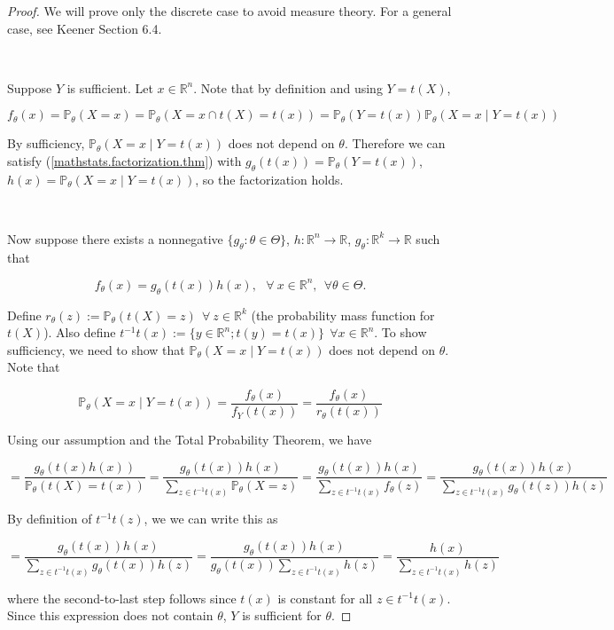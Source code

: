 \begin{proof} We will prove only the discrete case to avoid measure theory. For a general case, see Keener Section 6.4. 

\

Suppose \(Y\) is sufficient. Let \(x \in \mathbb{R}^n\). Note that by definition and using \(Y = t(X)\),

\[
f_\theta(x) = \mathbb{P}_\theta (X = x) = \mathbb{P}_\theta (X = x \cap t(X) = t(x)) = \mathbb{P}_\theta ( Y = t(x))   \mathbb{P}_\theta (X = x \mid Y = t(x)) 
\]

By sufficiency, \( \mathbb{P}_\theta (X = x \mid Y = t(x)) \) does not depend on \(\theta\). Therefore we can satisfy (\ref{mathstats.factorization.thm}) with \(g_\theta(t(x)) = \mathbb{P}_\theta ( Y = t(x))  \), \(h(x) = \mathbb{P}_\theta (X = x \mid Y = t(x))  \), so the factorization holds.

\

Now suppose there exists a nonnegative \(\{g_\theta: \theta \in \Theta\}\), \(h: \mathbb{R}^n \to \mathbb{R}\), \(g_\theta: \mathbb{R}^k \to \mathbb{R}\) such that

\[
f_\theta(x) = g_\theta(t(x)) h(x), \ \ \ \forall \ x \in \mathbb{R}^n, \ \ \forall \theta \in \Theta.
\]

Define \(r_\theta(z) := \mathbb{P}_\theta(t(X) = z)  \ \ \forall \ z \in \mathbb{R}^k\) (the probability mass function for \(t(X)\)).  Also define \(t^{-1} t(x) := \{y \in \mathbb{R}^n; t(y) = t(x) \} \ \ \forall x \in \mathbb{R}^n\). To show sufficiency, we need to show that \(\mathbb{P}_\theta (X = x \mid Y = t(x))\) does not depend on \(\theta\). Note that

\[
\mathbb{P}_\theta (X = x \mid Y = t(x)) = \frac{f_\theta(x)}{f_Y(t(x))}= \frac{f_\theta(x)}{r_\theta(t(x))}
\]

Using our assumption and the Total Probability Theorem, we have

\[
= \frac{ g_\theta(t(x) h(x))}{\mathbb{P}_\theta(t(X) = t(x))} = \frac{ g_\theta(t(x)) h(x)}{\sum_{z \in t^{-1} t(x)} \mathbb{P}_\theta (X = z)} = \frac{ g_\theta(t(x)) h(x)}{\sum_{z \in t^{-1} t(x)} f_\theta(z)}  = \frac{ g_\theta(t(x)) h(x)}{\sum_{z \in t^{-1} t(x)}  g_\theta(t(z)) h(z) }
\]

By definition of \(t^{-1}t(z)\), we we can write this as

\[
= \frac{ g_\theta(t(x)) h(x)}{\sum_{z \in t^{-1} t(x)}  g_\theta(t(x)) h(z) }= \frac{ g_\theta(t(x)) h(x)}{g_\theta(t(x))\sum_{z \in t^{-1} t(x)}   h(z) }  = \frac{  h(x)}{\sum_{z \in t^{-1} t(x)}   h(z) }
\]

where the second-to-last step follows since \(t(x)\) is constant for all \(z \in t^{-1} t(x)\). Since this expression does not contain \(\theta\), \(Y\) is sufficient for \(\theta\).

\end{proof}

